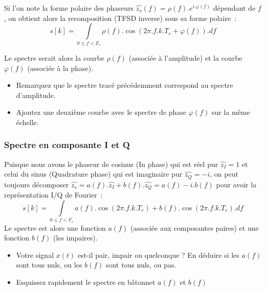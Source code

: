 \documentclass[a4paper,twoside,12pt]{report}           %
\begin{document}
 Si l'on note la forme polaire des phaseurs
 $\widehat{z_s}(f)=\rho(f).e^{i.\varphi(f)}$ dépendant de $f$, on
 obtient alors la recomposition (TFSD inverse) sous sa forme polaire~:
 \begin{equation}
   \label{eq:itfsd_polaire}
   s[k] = \int\limits_{0\leq f < F_e}{\rho(f).\cos\left(2\pi.f.k.T_e+\varphi(f)\right).df}
 \end{equation}

 Le spectre serait alors la courbe $\rho(f)$ (associée à l'amplitude)
 et la courbe $\varphi(f)$ (associée à la phase).

 \begin{itemize}
 \item Remarquez que le spectre tracé précédemment correspond au
   spectre d'amplitude.
 \item Ajoutez une deuxième courbe avec le spectre de phase
   $\varphi(f)$ sur la même échelle.
 \end{itemize}


 \subsubsection{Spectre en composante I et Q}

 Puisque nous avons le phaseur de cosinus (In phase) qui est réel pur
 $\hat{z_I}=1$ et celui du sinus (Quadrature phase) qui est imaginaire
 pur $\hat{z_Q}=-i$, on peut toujours décomposer
 $\hat{z_s}= a(f) .\hat{z_I} + b(f) .\hat{z_Q} = a(f) - i. b(f)$ pour
 avoir la représentation I/Q de Fourier~:
 \begin{equation}
   \label{eq:itfsd_polaire}
   s[k] = \int\limits_{0\leq f < F_e}{a(f).\cos\left(2\pi.f.k.T_e\right) + b(f).\cos\left(2\pi.f.k.T_e\right).df}
 \end{equation}
 Le spectre est alors une fonction $a(f)$ (associée aux composantes
 paires) et une fonction $b(f)$ (les impaires).
 \begin{itemize}
 \item Votre signal $x(t)$ est-il pair, impair ou quelconque ? En
   déduire si les $a(f)$ sont tous nuls, ou les $b(f)$ sont tous nuls,
   ou pas.
 \item Esquissez rapidement le spectre en bâtonnet $a(f)$ et $b(f)$
 \end{itemize}
\end{document}
